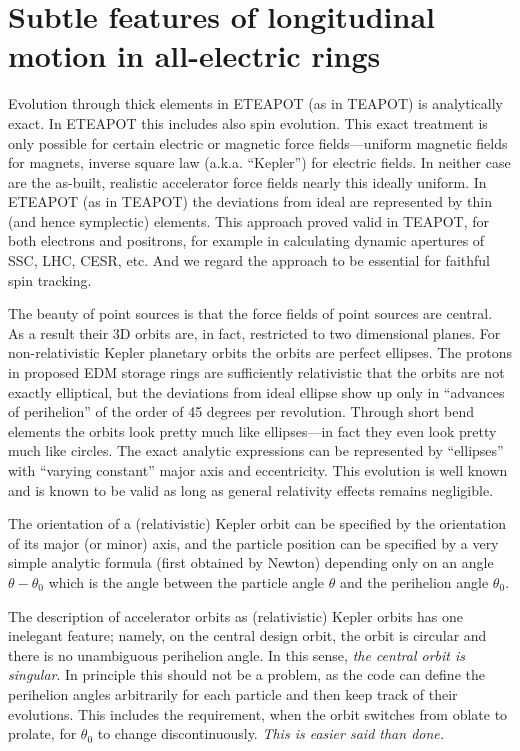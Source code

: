 \documentclass[]{article}
\begin{document}

\section{Subtle features of longitudinal motion in all-electric rings}
Evolution through thick elements in ETEAPOT (as in TEAPOT) is analytically
exact. In ETEAPOT this includes also spin evolution.
This exact treatment is only possible for certain electric or magnetic 
force fields---uniform magnetic fields for magnets, inverse square law 
(a.k.a. ``Kepler'') for electric fields. In neither case are the as-built,
realistic accelerator force fields nearly this ideally uniform. In ETEAPOT 
(as in TEAPOT) the deviations from ideal are represented by thin
(and hence symplectic) elements. This approach proved valid in TEAPOT,
for both electrons and positrons, for example in calculating dynamic 
apertures of SSC, LHC, CESR, etc. And we regard the approach to be essential
for faithful spin tracking.

The beauty of point sources is that the force fields of point sources
are central. As
a result their 3D orbits are, in fact, restricted to two dimensional
planes. For non-relativistic Kepler planetary orbits the orbits are
perfect ellipses. The protons in proposed EDM storage rings are
sufficiently relativistic that the orbits are not exactly elliptical,
but the deviations from ideal ellipse show up only in ``advances of
perihelion'' of the order of 45 degrees per revolution. Through short
bend elements the orbits look pretty much like ellipses---in fact they
even look pretty much like circles. The exact analytic expressions can
be represented by ``ellipses'' with ``varying constant'' major axis and 
eccentricity. This evolution is well known and is known to be valid
as long as general relativity effects remains negligible.

The orientation of a (relativistic) Kepler orbit can be specified by
the orientation of its major (or minor) axis, and the particle position
can be specified by a very simple analytic formula (first obtained
by Newton) depending only on an angle $\theta-\theta_0$ which is the angle between
the particle angle $\theta$ and the perihelion angle $\theta_0$.
  
The description of accelerator orbits as (relativistic) Kepler orbits
has one inelegant feature; namely, on the central design orbit, the orbit is
circular and there is no unambiguous perihelion angle. In this sense,
\emph{the central orbit is singular}. In principle this
should not be a problem, as the code can define the perihelion angles
arbitrarily for each particle and then keep track of their evolutions.
This includes the requirement, when the orbit switches from oblate 
to prolate, for $\theta_0$ to change discontinuously. 
\emph{This is easier said than done.}
\end{document}
